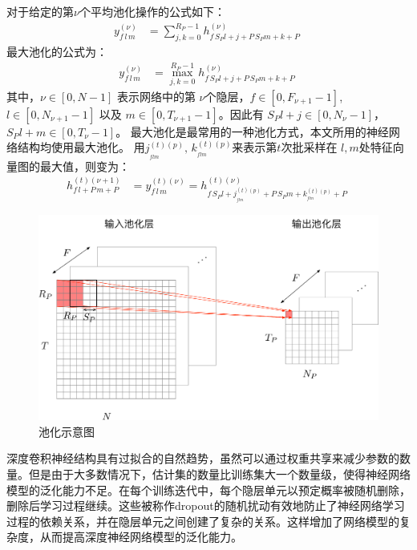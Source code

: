 对于给定的第$\nu$个平均池化操作的公式如下：
\begin{align}
  y_{f\,l\,m}^{(\nu)}&=\sum^{R_P-1}_{j,k=0} h_{f\,S_P l+j+P\,S_Pm+k+P}^{(\nu)}\;
  \label{equ:pool}
\end{align}
最大池化的公式为：
\begin{align}
  y_{f\,l\,m}^{(\nu)}&=\max^{R_P-1}_{j,k=0} h_{f\,S_P l+j+P\,S_Pm+k+P}^{(\nu)}\;
  \label{equ:maxpool}
\end{align}
其中，$\nu \in [0,N-1 ]$ 表示网络中的第 $\nu$个隐层，$f\in[0,F_{\nu+1}-1]$, $l\in[0,N_{\nu+1}-1 ]$ 以及 $m\in[0,T_{\nu+1}-1 ]$。因此有 $S_Pl+j\in[0,N_\nu-1 ]$， $S_Pl+m\in[0,T_\nu-1 ]$。
最大池化是最常用的一种池化方式，本文所用的神经网络结构均使用最大池化。
用$j^{(t)(p)}_{_{flm}},\,k^{(t)(p)}_{_{flm}}$来表示第$t$次批采样在 $l,m$处特征向量图的最大值，则变为：
\begin{align}
h_{f\,l+P\,m+P}^{(t)(\nu+1)}&=y_{f\,l\,m}^{(t)(\nu)}=
h^{(t)(\nu)}_{f\,S_P l+j^{(t)(p)}_{_{flm}}+P\,S_Pm+k^{(t)(p)}_{_{flm}}+P}\;
\end{align}

\begin{figure}[hbt]
	\centering
	\includegraphics[width=13.5cm]{figures/networks/pooling}
	\caption{池化示意图}
	\label{fig:pool}
\end{figure}

深度卷积神经结构具有过拟合的自然趋势，虽然可以通过权重共享来减少参数的数量。但是由于大多数情况下，估计集的数量比训练集大一个数量级，使得神经网络模型的泛化能力不足。在每个训练迭代中，每个隐层单元以预定概率被随机删除，删除后学习过程继续。这些被称作dropout的随机扰动有效地防止了神经网络学习过程的依赖关系，并在隐层单元之间创建了复杂的关系。这样增加了网络模型的复杂度，从而提高深度神经网络模型的泛化能力。


